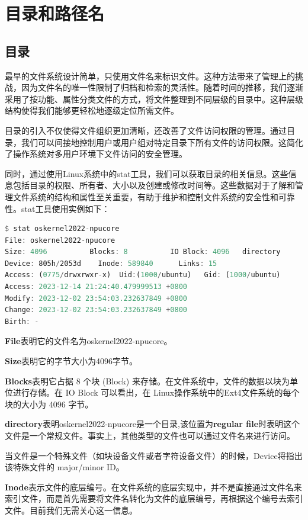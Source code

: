 \section{目录和路径名}
\subsection{目录}
最早的文件系统设计简单，只使用文件名来标识文件。这种方法带来了管理上的挑战，因为文件名的唯一性限制了归档和检索的灵活性。随着时间的推移，我们逐渐采用了按功能、属性分类文件的方式，将文件整理到不同层级的目录中。这种层级结构使得我们能够更轻松地逐级定位所需文件。

目录的引入不仅使得文件组织更加清晰，还改善了文件访问权限的管理。通过目录，我们可以间接地控制用户或用户组对特定目录下所有文件的访问权限。这简化了操作系统对多用户环境下文件访问的安全管理。

同时，通过使用Linux系统中的stat工具，我们可以获取目录的相关信息。这些信息包括目录的权限、所有者、大小以及创建或修改时间等。这些数据对于了解和管理文件系统的结构和属性至关重要，有助于维护和控制文件系统的安全性和可靠性。stat工具使用实例如下：

\begin{lstlisting}[language=Rust]
$ stat oskernel2022-npucore
File: oskernel2022-npucore
Size: 4096          Blocks: 8          IO Block: 4096   directory
Device: 805h/2053d    Inode: 589840      Links: 15
Access: (0775/drwxrwxr-x)  Uid:(1000/ubuntu)   Gid: (1000/ubuntu)
Access: 2023-12-14 21:24:40.479999513 +0800
Modify: 2023-12-02 23:54:03.232637849 +0800
Change: 2023-12-02 23:54:03.232637849 +0800
Birth: -
\end{lstlisting}

\textbf{File}表明它的文件名为oskernel2022-npucore。

\textbf{Size}表明它的字节大小为4096字节。

\textbf{Blocks}表明它占据 8 个块 (Block) 来存储。在文件系统中，文件的数据以块为单位进行存储。在 IO Block 可以看出，在 Linux操作系统中的Ext4文件系统的每个块的大小为 4096 字节。

\textbf{directory}表明oskernel2022-npucore是一个目录,该位置为\textbf{regular file}时表明这个文件是一个常规文件。事实上，其他类型的文件也可以通过文件名来进行访问。

当文件是一个特殊文件（如块设备文件或者字符设备文件）的时候，Device将指出该特殊文件的 major/minor ID。

\textbf{Inode}表示文件的底层编号。在文件系统的底层实现中，并不是直接通过文件名来索引文件，而是首先需要将文件名转化为文件的底层编号，再根据这个编号去索引文件。目前我们无需关心这一信息。

